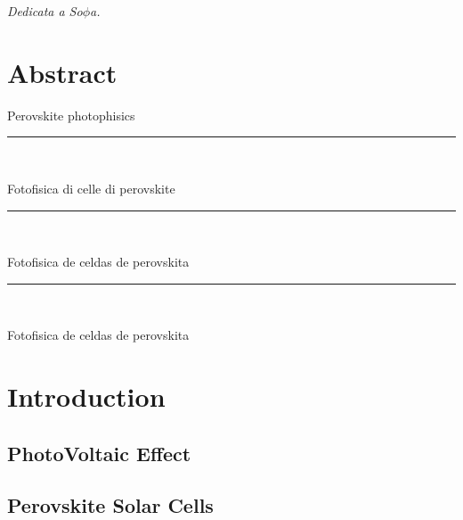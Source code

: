 \documentclass[a4paper, 12pt, openright]{book}
\begin{document}
\cleardoublepage \vspace*{12cm}
\begin{flushright}
\large {\it Dedicata a So$\phi$a.}
\end{flushright}


\chapter[Abstract]{\centering Abstract}
\vfill
Perovskite photophisics

{
\vfill
\centering \rule{5cm}{1pt}\\
\vfill
}
\noindent
Fotofisica di celle di perovskite

{
	\vfill
	\centering \rule{5cm}{1pt}\\
	\vfill
}
\noindent

Fotofisica de celdas de perovskita

{
	\vfill
	\centering \rule{5cm}{1pt}\\
	\vfill
}
\noindent

Fotofisica de celdas de perovskita

\vfill


\restoregeometry


\mainmatter
\pagestyle{headings}


\chapter{Introduction}
%

	\section{PhotoVoltaic Effect}
	
	\section{Perovskite Solar Cells}
	
\end{document}

